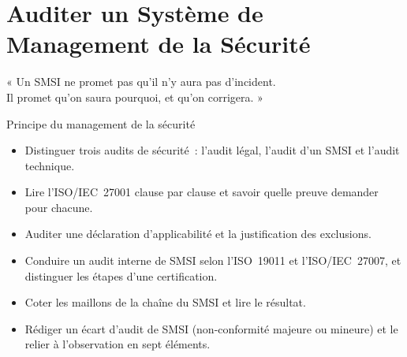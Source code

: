 
\chapter{Auditer un Système de Management de la Sécurité}
\label{chap:audit-smsi}

\epigraph{%
    « Un SMSI ne promet pas qu'il n'y aura pas d'incident.\\
    Il promet qu'on saura pourquoi, et qu'on corrigera. »%
}{Principe du management de la sécurité}


\begin{boxobjectifs}
\begin{itemize}
    \item Distinguer trois audits de sécurité~: l'audit légal, l'audit d'un
          SMSI et l'audit technique.
    \item Lire l'ISO/IEC~27001 clause par clause et savoir quelle preuve
          demander pour chacune.
    \item Auditer une déclaration d'applicabilité et la justification des
          exclusions.
    \item Conduire un audit interne de SMSI selon l'ISO~19011 et
          l'ISO/IEC~27007, et distinguer les étapes d'une certification.
    \item Coter les maillons de la chaîne du SMSI et lire le résultat.
    \item Rédiger un écart d'audit de SMSI (non-conformité majeure ou
          mineure) et le relier à l'observation en sept éléments.
\end{itemize}
\end{boxobjectifs}

